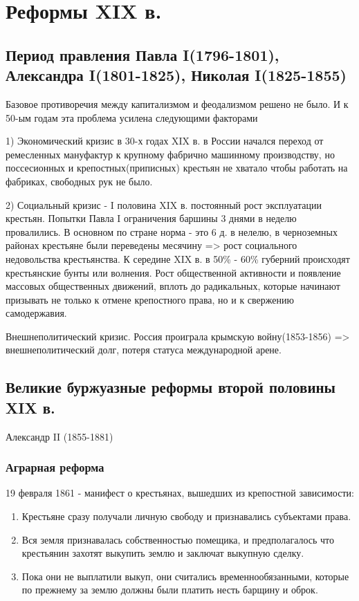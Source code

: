 \documentclass[a4paper]{article}
\begin{document}
\section{Реформы XIX в.}
\subsection{Период правления Павла I(1796-1801),
         Александра I(1801-1825), Николая I(1825-1855)}

Базовое противоречия между капитализмом и феодализмом решено не было. И к 50-ым годам эта проблема усилена следующими факторами

1) Экономический кризис в 30-х годах XIX в. в России начался переход от ремесленных мануфактур к крупному фабрично машинному производству, но поссесионных и крепостных(приписных) крестьян не хватало чтобы работать на фабриках, свободных рук не было.

2) Социальный кризис - I половина XIX в. постоянный рост эксплуатации крестьян. Попытки Павла I ограничения баршины 3 днями в неделю провалились. В основном по стране норма - это 6 д. в нелелю, в черноземных районах крестьяне были переведены месячину => рост социального недовольства крестьянства.
К середине XIX в. в 50\% - 60\% губерний происходят крестьянские бунты или волнения.
Рост общественной активности и появление массовых общественных движений, вплоть до радикальных, которые начинают призывать не только к отмене крепостного права,
но и к свержению самодержавия.

Внешнеполитический кризис.
Россия проиграла крымскую войну(1853-1856) => внешнеполитический долг, потеря статуса международной арене.

\subsection{Великие буржуазные реформы второй половины XIX в.}
Александр II (1855-1881)

\subsubsection{Аграрная реформа}
19 февраля 1861 - манифест о крестьянах, вышедших из крепостной зависимости:
\begin{enumerate}
    \item Крестьяне сразу получали личную свободу и признавались субъектами права.
    \item Вся земля признавалась собственностью помещика, и предполагалось что крестьянин захотят выкупить землю и заключат выкупную сделку.
    \item Пока они не выплатили выкуп, они считались временнообязанными, которые по прежнему за землю должны были платить несть барщину и оброк.
\end{enumerate}
\end{document}
